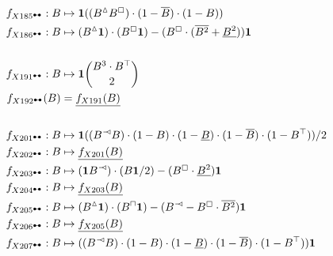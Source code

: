\documentclass{article}
\theoremstyle{plain}
\begin{document}
\begin{align*}
f_{X185^\dumbbell}: B&\mapsto {\bf 1}((B^\vartriangle B^\boxempty)\cdot(1-\overline{B})\cdot(1-B))\\
f_{X186^\dumbbell}: B&\mapsto (B^\vartriangle{\bf 1})\cdot (B^\boxempty{\bf 1})-(B^\boxempty\cdot(\overline{B^2}+\underline{B^2})){\bf 1}\\
&\\%
f_{X191^\dumbbell}: B&\mapsto {\bf 1}\binom{B^3\cdot B^\top}{2}\\
f_{X192^\dumbbell}(B) &=\underline{f_{X191}(B)}\\
&\\%
f_{X201^\dumbbell}: B&\mapsto {\bf 1}((B^\arro B)\cdot(1-B)\cdot(1-\underline{B})\cdot(1-\overline{B})\cdot(1-B^\top))/2\\
f_{X202^\dumbbell}: B&\mapsto \underline{f_{X201}(B)}\\
f_{X203^\dumbbell}: B&\mapsto ({\bf 1}B^\arro)\cdot (B{\bf 1}/2)-(B^\boxempty\cdot\underline{B^2}){\bf 1}\\
f_{X204^\dumbbell}: B&\mapsto \underline{f_{X203}(B)}\\
f_{X205^\dumbbell}: B&\mapsto (B^\vartriangle{\bf 1})\cdot (B^\sqcap{\bf 1})-(B^\arro-B^\boxempty\cdot\overline{B^2}){\bf 1}\\
f_{X206^\dumbbell}: B&\mapsto \underline{f_{X205}(B)}\\
f_{X207^\dumbbell}: B&\mapsto ((B^\arro B)\cdot(1-B)\cdot(1-\underline{B})\cdot(1-\overline{B})\cdot(1-B^\top)){\bf 1}
\end{align*}
\end{document}
